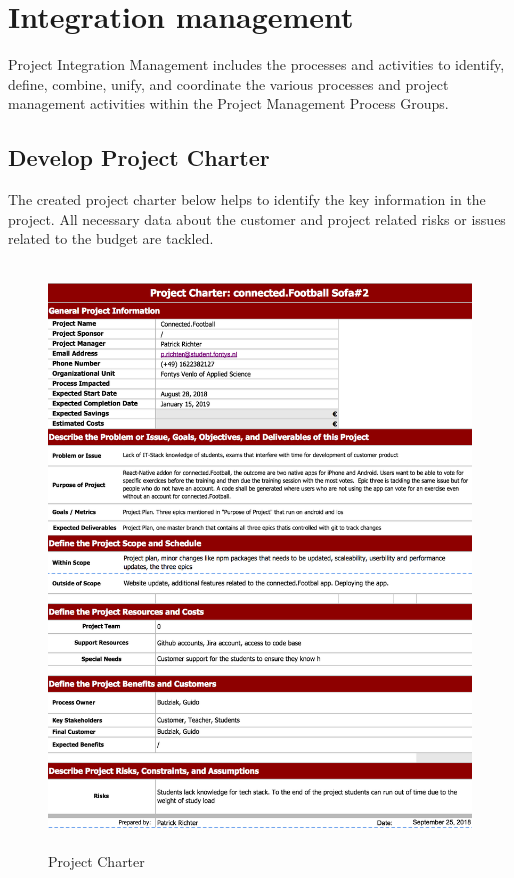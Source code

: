 \section{Integration management}
\label{sec:integration}
Project Integration Management includes the processes and activities to identify, define, combine, unify, and
coordinate the various processes and project management activities within the Project Management Process
Groups.
\newpage

\subsection{Develop Project Charter}
The created project charter below helps to identify the key information in the project.
All necessary data about the customer and project related risks or issues related to the budget are tackled.

\begin{figure}[!ht]
  \includegraphics[width=425px, height=585px]{content/diagram/integration/projectChater.png}
  \caption{Project Charter}
\end{figure}
\newpage


